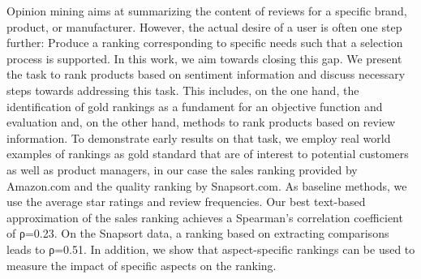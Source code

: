 Opinion mining aims at summarizing the content of reviews for a specific brand, product, or manufacturer. However, the actual desire of a user is often one step further: Produce a ranking corresponding to specific needs such that a selection process is supported. In this work, we aim towards closing this gap. We present the task to rank products based on sentiment information and discuss necessary steps towards addressing this task. This includes, on the one hand, the identification of gold rankings as a fundament for an objective function and evaluation and, on the other hand, methods to rank products based on review information. To demonstrate early results on that task, we employ real world examples of rankings as gold standard that are of interest to potential customers as well as product managers, in our case the sales ranking provided by Amazon.com and the quality ranking by Snapsort.com. As baseline methods, we use the average star ratings and review frequencies. Our best text-based approximation of the sales ranking achieves a Spearman's correlation coefficient of ρ=0.23. On the Snapsort data, a ranking based on extracting comparisons leads to  ρ=0.51. In addition, we show that aspect-specific rankings can be used to measure the impact of specific aspects on the ranking.
